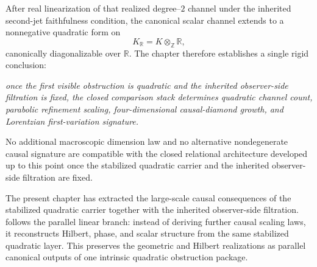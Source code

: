 After real linearization of that realized degree--\(2\) channel under
the inherited second-jet faithfulness condition, the canonical scalar
channel extends to a nonnegative quadratic form on
\[
	K_{\mathbb R}=K\otimes_{\mathbb Z}\mathbb R,
\]
canonically diagonalizable over \(\mathbb R\).
The chapter therefore establishes a single rigid conclusion:
\begin{center}
	\emph{
		once the first visible obstruction is quadratic and the inherited
		observer-side filtration is fixed, the closed comparison stack
		determines quadratic channel count, parabolic refinement scaling,
		four-dimensional causal-diamond growth, and Lorentzian
		first-variation signature.
	}
\end{center}
No additional macroscopic dimension law and no alternative nondegenerate
causal signature are compatible with the closed relational architecture
developed up to this point once the stabilized quadratic carrier and
the inherited observer-side filtration are fixed.
\begin{remark}
	The present chapter has extracted the large-scale causal consequences of
	the stabilized quadratic carrier together with the inherited
	observer-side filtration.   follows the parallel
	linear branch: instead of deriving further causal scaling laws, it
	reconstructs Hilbert, phase, and scalar structure from the same
	stabilized quadratic layer.  This preserves the geometric and Hilbert
	realizations as parallel canonical outputs of one intrinsic quadratic
	obstruction package.
\end{remark}

\begin{chapterclosing}
\end{chapterclosing}
